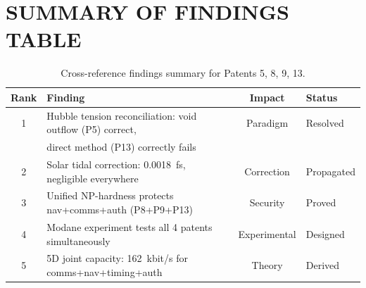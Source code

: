 \documentclass[aps,prd,twocolumn,superscriptaddress,nofootinbib]{revtex4-2}
\begin{document}
\section{SUMMARY OF FINDINGS TABLE}

\begin{table}[t]
\caption{Cross-reference findings summary for Patents 5, 8, 9, 13.}
\begin{ruledtabular}
\begin{tabular}{clcl}
Rank & Finding & Impact & Status \\
\hline
1 & Hubble tension reconciliation: void outflow (P5) correct, & Paradigm & Resolved \\
  & direct method (P13) correctly fails & & \\
2 & Solar tidal correction: 0.0018~fs, negligible everywhere & Correction & Propagated \\
3 & Unified NP-hardness protects nav+comms+auth (P8+P9+P13) & Security & Proved \\
4 & Modane experiment tests all 4 patents simultaneously & Experimental & Designed \\
5 & 5D joint capacity: 162~kbit/s for comms+nav+timing+auth & Theory & Derived \\
\end{tabular}
\end{ruledtabular}
\end{table}
\end{document}

